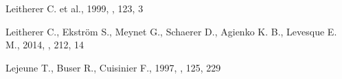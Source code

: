 \begin{thebibliography}{}

 Leitherer C. et al., 1999, \apjs, 123, 3

 Leitherer C., Ekstr\"om S., 
Meynet G., Schaerer D., Agienko K. B., Levesque E. M., 2014, \apjs, 212, 14


Lejeune T., Buser R., Cuisinier F., 1997, \aaps, 125, 229













\end{thebibliography}
